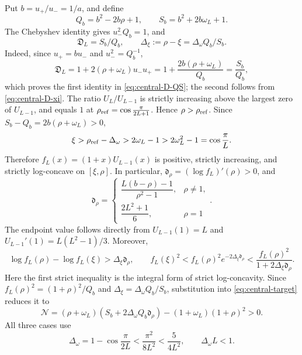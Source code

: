 \documentclass[10pt,twoside]{siamart1116}
\numberwithin{equation}{section}
\begin{document}
Put \(b=u_+/u_-=1/a\), and define
\[
 Q_b=b^2-2b\rho+1,\qquad S_b=b^2+2b\omega_L+1.
\]
The Chebyshev identity gives \(u_-^2Q_b=1\), and
\begin{equation}\label{eq:central-D-QS}
 \mathfrak D_L=S_b/Q_b,\qquad
 \Delta_\xi:=\rho-\xi=\Delta_\omega Q_b/S_b.
\end{equation}
Indeed, since \(u_+=bu_-\) and \(u_-^2=Q_b^{-1}\),
\[
 \mathfrak D_L=1+2(\rho+\omega_L)u_-u_+
  =1+\frac{2b(\rho+\omega_L)}{Q_b}=\frac{S_b}{Q_b},
\]
which proves the first identity in \eqref{eq:central-D-QS}; the second
follows from
\eqref{eq:central-D-xi}.
The ratio \(U_L/U_{L-1}\) is strictly increasing above the largest zero
of \(U_{L-1}\), and equals \(1\) at
\(\rho_{\rm ref}=\cos\frac{\pi}{2L+1}\).  Hence
\(\rho>\rho_{\rm ref}\).  Since
\(S_b-Q_b=2b(\rho+\omega_L)>0\),
\[
 \xi>\rho_{\rm ref}-\Delta_\omega>2\omega_L-1
 >2\omega_L^2-1=\cos\frac{\pi}{L}.
\]
Therefore \(f_L(x)=(1+x)U_{L-1}(x)\) is positive, strictly increasing,
and strictly log-concave on \([\xi,\rho]\).  In particular,
\(\mathfrak d_\rho=(\log f_L)'(\rho)>0\), and
\[
 \mathfrak d_\rho=
 \begin{cases}
  \dfrac{L(b-\rho)-1}{\rho^2-1},&\rho\neq1,\\[6pt]
  \dfrac{2L^2+1}{6},&\rho=1
 \end{cases}.
\]
The endpoint value follows directly from \(U_{L-1}(1)=L\) and
\(U_{L-1}'(1)=L(L^2-1)/3\).  Moreover,
\[
 \log f_L(\rho)-\log f_L(\xi)>\Delta_\xi\mathfrak d_\rho,
 \qquad
 f_L(\xi)^2<f_L(\rho)^2e^{-2\Delta_\xi\mathfrak d_\rho}
 <\frac{f_L(\rho)^2}{1+2\Delta_\xi\mathfrak d_\rho}.
\]
Here the first strict inequality is the integral form of strict
log-concavity.  Since
\(f_L(\rho)^2=(1+\rho)^2/Q_b\) and
\(\Delta_\xi=\Delta_\omega Q_b/S_b\), substitution into
\eqref{eq:central-target} reduces it to
\begin{equation}\label{eq:N-positive-target}
 \mathcal N=(\rho+\omega_L)
 (S_b+2\Delta_\omega Q_b\mathfrak d_\rho)
 -(1+\omega_L)(1+\rho)^2>0.
\end{equation}
All three cases use
\begin{equation}\label{eq:Delta-omega-basic-bound}
 \Delta_\omega=1-\cos\frac{\pi}{2L}
 <\frac{\pi^2}{8L^2}<\frac5{4L^2},
 \qquad \Delta_\omega L<1.
\end{equation}
\end{document}
